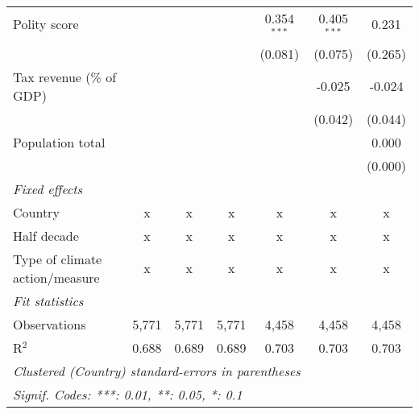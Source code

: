 \begin{tabular}{lcccccc}
   Polity score                                             &             &                &                & 0.354$^{***}$  & 0.405$^{***}$  & 0.231\\   
                                                            &             &                &                & (0.081)        & (0.075)        & (0.265)\\   
   Tax revenue (\% of GDP)                                  &             &                &                &                & -0.025         & -0.024\\   
                                                            &             &                &                &                & (0.042)        & (0.044)\\   
   Population total                                         &             &                &                &                &                & 0.000\\   
                                                            &             &                &                &                &                & (0.000)\\   
   \emph{Fixed effects}\\
   Country                                                  & x           & x              & x              & x              & x              & x\\  
   Half decade                                              & x           & x              & x              & x              & x              & x\\  
   Type of climate action/measure                           & x           & x              & x              & x              & x              & x\\  
   \midrule \emph{Fit statistics}\\
   Observations                                             & 5,771       & 5,771          & 5,771          & 4,458          & 4,458          & 4,458\\  
   R$^2$                                                    & 0.688       & 0.689          & 0.689          & 0.703          & 0.703          & 0.703\\  
   \midrule
   \multicolumn{7}{l}{\emph{Clustered (Country) standard-errors in parentheses}}\\
   \multicolumn{7}{l}{\emph{Signif. Codes: ***: 0.01, **: 0.05, *: 0.1}}\\
\end{tabular}
\par\endgroup


